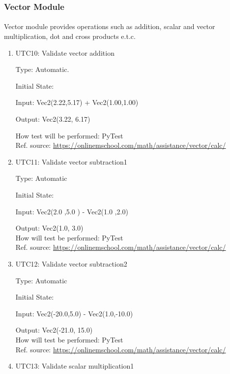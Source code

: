 \documentclass[12pt, titlepage]{article}
\begin{document}
\subsubsection{Vector Module}

\paragraph{}
Vector module provides operations such as addition, scalar and vector multiplication, dot and cross products e.t.c.
\begin{enumerate}
	
	\item{UTC10}{: Validate vector addition \\}
	
	Type: Automatic.
	
	Initial State: 
	
	Input: Vec2(2.22,5.17) + Vec2(1.00,1.00)
	
	Output: Vec2(3.22, 6.17)
	
	How test will be performed: PyTest \\
	Ref. source: \url{https://onlinemschool.com/math/assistance/vector/calc/}
	
	\item{UTC11}{: Validate vector subtraction1\\}
	
	Type: Automatic
	
	Initial State: 
	
	Input: Vec2(2.0 ,5.0 ) - Vec2(1.0 ,2.0)
	
	Output: Vec2(1.0, 3.0)\\
	How will test be performed: PyTest\\
	Ref. source: \url{https://onlinemschool.com/math/assistance/vector/calc/}
	
	\item{UTC12}{: Validate vector subtraction2\\}
	
	Type: Automatic
	
	Initial State: 
	
	Input: Vec2(-20.0,5.0) - Vec2(1.0,-10.0)
	
	Output: Vec2(-21.0, 15.0)\\
	How will test be performed: PyTest\\
	Ref. source: \url{https://onlinemschool.com/math/assistance/vector/calc/}
	
	\item{UTC13}{: Validate scalar multiplication1\\}
	

\end{enumerate}
\end{document}
